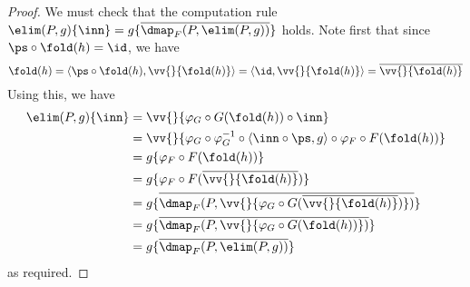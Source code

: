 \documentclass{article}
\begin{document}
\begin{proof}
We must check that the computation rule $\elim(P, g)\{\inn\} =
g\{\overline{\dmap_F(P, \elim(P, g))}\}$ holds. Note first that since
$\ps \circ \fold(h) = \id$, we have
\[
\fold(h) = \langle \ps \circ \fold(h), \vv{}\{\fold(h)\}\rangle
         = \langle \id , \vv{}\{\fold(h)\}\rangle
         = \overline{\vv{}\{\fold(h)\}}
\]
Using this, we have
\begin{align*}
  \elim(P, g)\{\inn\} &=  \vv{}\{\varphi_G \circ G(\fold(h)) \circ \inn\} \\
                      &=  \vv{}\{\varphi_G \circ \varphi_G^{-1} \circ \langle \inn \circ \ps, g\rangle \circ \varphi_F \circ F(\fold(h))\} \\
                      &=  g\{\varphi_F \circ F(\fold(h))\} \\
                      &=  g\{\varphi_F \circ F(\overline{\vv{}\{\fold(h)\}})\} \\
                      &=  g\{\overline{\dmap_F(P, \vv{}\{\varphi_G \circ G(\overline{\vv{}\{\fold(h)\}})\})}\} \\
                      &=  g\{\overline{\dmap_F(P, \vv{}\{\varphi_G \circ G(\fold(h))\})}\} \\
                      &=  g\{\overline{\dmap_F(P, \elim(P, g))}\}
\end{align*}
as required.
\end{proof}



\end{document}
